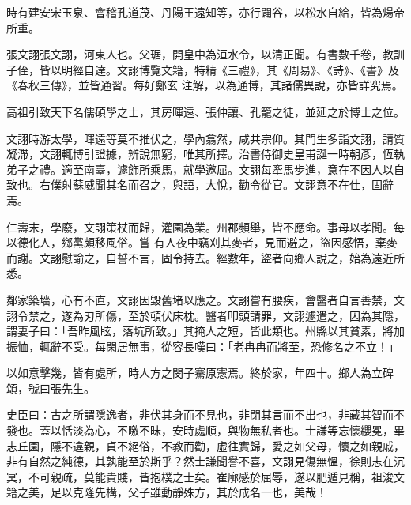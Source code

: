 \begin{pinyinscope}
 時有建安宋玉泉、會稽孔道茂、丹陽王遠知等，亦行闢谷，以松水自給，皆為煬帝所重。



 張文詡張文詡，河東人也。父琚，開皇中為洹水令，以清正聞。有書數千卷，教訓子侄，皆以明經自達。文詡博覽文籍，特精《三禮》，其《周易》、《詩》、《書》及《春秋三傳》，並皆通習。每好鄭玄
 注解，以為通博，其諸儒異說，亦皆詳究焉。



 高祖引致天下名儒碩學之士，其房暉遠、張仲讓、孔籠之徒，並延之於博士之位。



 文詡時游太學，暉遠等莫不推伏之，學內翕然，咸共宗仰。其門生多詣文詡，請質凝滯，文詡輒博引證據，辨說無窮，唯其所擇。治書侍御史皇甫誕一時朝彥，恆執弟子之禮。適至南臺，遽飾所乘馬，就學邀屈。文詡每牽馬步進，意在不因人以自致也。右僕射蘇威聞其名而召之，與語，大悅，勸令從官。文詡意不在仕，固辭焉。



 仁壽末，學廢，文詡策杖而歸，灌園為業。州郡頻舉，皆不應命。事母以孝聞。每以德化人，鄉黨頗移風俗。嘗
 有人夜中竊刈其麥者，見而避之，盜因感悟，棄麥而謝。文詡慰諭之，自誓不言，固令持去。經數年，盜者向鄉人說之，始為遠近所悉。



 鄰家築墻，心有不直，文詡因毀舊堵以應之。文詡嘗有腰疾，會醫者自言善禁，文詡令禁之，遂為刃所傷，至於頓伏床枕。醫者叩頭請罪，文詡遽遣之，因為其隱，謂妻子曰：「吾昨風眩，落坑所致。」其掩人之短，皆此類也。州縣以其貧素，將加振恤，輒辭不受。每閑居無事，從容長嘆曰：「老冉冉而將至，恐修名之不立！」



 以如意擊幾，皆有處所，時人方之閔子騫原憲焉。終於家，年四十。鄉人為立碑頌，號曰張先生。



 史臣曰：古之所謂隱逸者，非伏其身而不見也，非閉其言而不出也，非藏其智而不發也。蓋以恬淡為心，不曒不昧，安時處順，與物無私者也。士謙等忘懷纓冕，畢志丘園，隱不違親，貞不絕俗，不教而勸，虛往實歸，愛之如父母，懷之如親戚，非有自然之純德，其孰能至於斯乎？然士謙聞譽不喜，文詡見傷無慍，徐則志在沉冥，不可親疏，莫能貴賤，皆抱樸之士矣。崔廓感於屈辱，遂以肥遁見稱，祖浚文籍之美，足以克隆先構，父子雖動靜殊方，其於成名一也，美哉！



\end{pinyinscope}